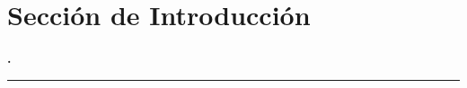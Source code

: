 \section{Sección de Introducción} %
\label{sec:intro} %
\begin{frame}
    \centering
    \vspace{1cm}
    {\LARGE\bfseries \insertsectionnumber. \insertsection}

    \rule{0.5\linewidth}{1pt}
\end{frame}



% 
% 
